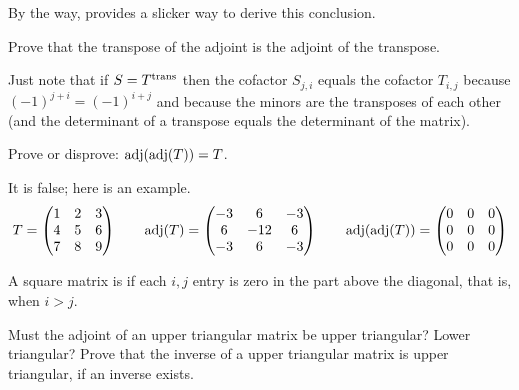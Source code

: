 \begin{exercises}
\begin{answer}
      By the way,  provides
      a slicker way to derive this conclusion.
    \end{answer}
  \recommended \item
    Prove that the transpose of the adjoint is the adjoint of the transpose.
    \begin{answer}
      Just note that if $S={{T}^{\rm trans}}$ then the cofactor
      $S_{j,i}$ equals the cofactor $T_{i,j}$ because $(-1)^{j+i}=(-1)^{i+j}$
      and because the minors are the transposes of each other (and the
      determinant of a transpose equals the determinant of the matrix).
    \end{answer}
  \item 
    Prove or disprove: \( \operatorname{adj}(\operatorname{adj}(T))=T \).
    \begin{answer}
      It is false; here is an example.
      \begin{equation*}
         T=\begin{pmatrix}
           1  &2   &3  \\
           4  &5   &6  \\
           7  &8   &9
         \end{pmatrix}
         \qquad
         \operatorname{adj}(T)=\begin{pmatrix}
          -3  &6   &-3 \\
           6  &-12 &6  \\
          -3  &6   &-3
         \end{pmatrix}
         \qquad
         \operatorname{adj}(\operatorname{adj}(T))=\begin{pmatrix}
           0  &0   &0  \\
           0  &0   &0  \\
           0  &0   &0
         \end{pmatrix}
      \end{equation*}
    \end{answer}
\item
    A square matrix is  if
    each \( i,j \) entry is zero in the part above the diagonal,
    that is, when \( i>j \).
    \begin{exparts}
      \partsitem
        Must the adjoint of an upper triangular matrix be upper triangular?
        Lower triangular?
      \partsitem Prove that the inverse of a upper triangular matrix
        is upper triangular, if an inverse exists.
    \end{exparts}
    \begin{answer}

\end{answer}
\end{exercises}
